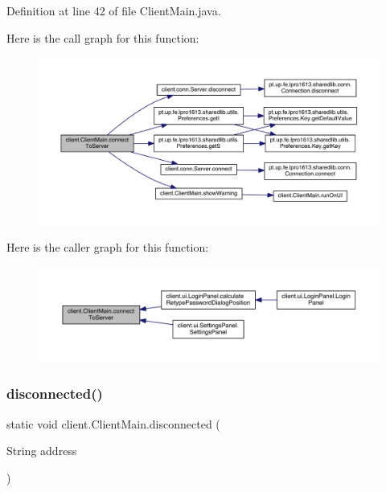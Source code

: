 Definition at line 42 of file Client\+Main.\+java.

Here is the call graph for this function\+:
\nopagebreak
\begin{figure}[H]
\begin{center}
\leavevmode
\includegraphics[width=350pt]{classclient_1_1_client_main_aecd59c193bdb0536d649be78f72149b0_cgraph}
\end{center}
\end{figure}
Here is the caller graph for this function\+:
\nopagebreak
\begin{figure}[H]
\begin{center}
\leavevmode
\includegraphics[width=350pt]{classclient_1_1_client_main_aecd59c193bdb0536d649be78f72149b0_icgraph}
\end{center}
\end{figure}
\hypertarget{classclient_1_1_client_main_a824ffde5fd1b48d4a6ec25a9b00c3dc5}{}\label{classclient_1_1_client_main_a824ffde5fd1b48d4a6ec25a9b00c3dc5} 
\subsubsection{\texorpdfstring{disconnected()}{disconnected()}}
{\footnotesize\ttfamily static void client.\+Client\+Main.\+disconnected (\begin{DoxyParamCaption}\item[{String}]{address }\end{DoxyParamCaption})\hspace{0.3cm}{\ttfamily [static]}}

